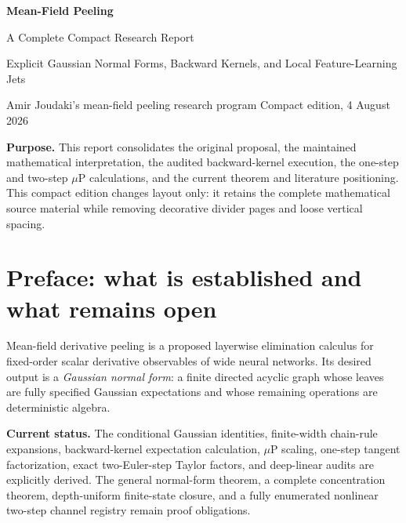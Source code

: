\documentclass[9pt,oneside]{extreport}
\begin{document}
\thispagestyle{empty}
\begin{center}
{\fontsize{22}{24}\selectfont\bfseries\color{accent}Mean-Field Peeling\par}
\vspace{0.25em}
{\large A Complete Compact Research Report\par}
{\normalsize Explicit Gaussian Normal Forms, Backward Kernels,
and Local Feature-Learning Jets\par}
\vspace{0.35em}
{\small Amir Joudaki's mean-field peeling research program
\hfill Compact edition, 4 August 2026\par}
\end{center}

\begin{statusbox}
\textbf{Purpose.}
This report consolidates the original proposal, the maintained mathematical
interpretation, the audited backward-kernel execution, the one-step and
two-step $\mu$P calculations, and the current theorem and literature
positioning. This compact edition changes layout only: it retains the complete
mathematical source material while removing decorative divider pages and loose
vertical spacing.
\end{statusbox}

\begingroup
\setlength{\parskip}{0pt}
\tableofcontents
\endgroup
\clearpage

\chapter*{Preface: what is established and what remains open}

Mean-field derivative peeling is a proposed layerwise elimination calculus
for fixed-order scalar derivative observables of wide neural networks.  Its
desired output is a \emph{Gaussian normal form}: a finite directed acyclic
graph whose leaves are fully specified Gaussian expectations and whose
remaining operations are deterministic algebra.

\begin{statusbox}
\textbf{Current status.}
The conditional Gaussian identities, finite-width chain-rule expansions,
backward-kernel expectation calculation, $\mu$P scaling, one-step tangent
factorization, exact two-Euler-step Taylor factors, and deep-linear audits are
explicitly derived.  The general normal-form theorem, a complete concentration
theorem, depth-uniform finite-state closure, and a fully enumerated nonlinear
two-step channel registry remain proof obligations.
\end{statusbox}
\end{document}
